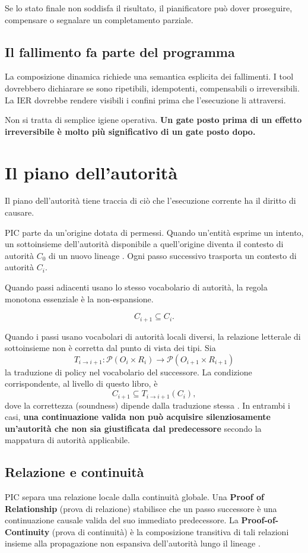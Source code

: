 \documentclass[10pt,oneside,openany]{book}
\newcommand{\term}[1]{\textbf{#1}}
\begin{document}
Se lo stato finale non soddisfa il risultato, il pianificatore può dover proseguire, compensare o segnalare un completamento parziale.

\section{Il fallimento fa parte del programma}
La composizione dinamica richiede una semantica esplicita dei fallimenti. I tool dovrebbero dichiarare se sono ripetibili, idempotenti, compensabili o irreversibili. La IER dovrebbe rendere visibili i confini prima che l'esecuzione li attraversi.

Non si tratta di semplice igiene operativa. \textbf{Un gate posto prima di un effetto irreversibile è molto più significativo di un gate posto dopo.}

\chapter{Il piano dell'autorità}

Il piano dell'autorità tiene traccia di ciò che l'esecuzione corrente ha il diritto di causare.

PIC parte da un'origine dotata di permessi. Quando un'entità esprime un intento, un sottoinsieme dell'autorità disponibile a quell'origine diventa il contesto di autorità \(C_0\) di un nuovo lineage \cite{gallo2026pic}. Ogni passo successivo trasporta un contesto di autorità \(C_i\).

Quando passi adiacenti usano lo stesso vocabolario di autorità, la regola monotona essenziale è la non-espansione.
\begin{formulabox}
\[
C_{i+1}\subseteq C_i.
\]
\end{formulabox}
Quando i passi usano vocabolari di autorità locali diversi, la relazione letterale di sottoinsieme non è corretta dal punto di vista dei tipi. Sia
\[
T_{i\rightarrow i+1}:\mathcal{P}(O_i\times R_i)\rightarrow\mathcal{P}(O_{i+1}\times R_{i+1})
\]
la traduzione di policy nel vocabolario del successore. La condizione corrispondente, al livello di questo libro, è
\[
C_{i+1}\subseteq T_{i\rightarrow i+1}(C_i),
\]
dove la correttezza (soundness) dipende dalla traduzione stessa \cite{gallo2026pic}. In entrambi i casi, \textbf{una continuazione valida non può acquisire silenziosamente un'autorità che non sia giustificata dal predecessore} secondo la mappatura di autorità applicabile.

\section{Relazione e continuità}
PIC separa una relazione locale dalla continuità globale. Una \term{Proof of Relationship} (prova di relazione) stabilisce che un passo successore è una continuazione causale valida del suo immediato predecessore. La \term{Proof-of-Continuity} (prova di continuità) è la composizione transitiva di tali relazioni insieme alla propagazione non espansiva dell'autorità lungo il lineage \cite{gallo2026pic}.
\end{document}
